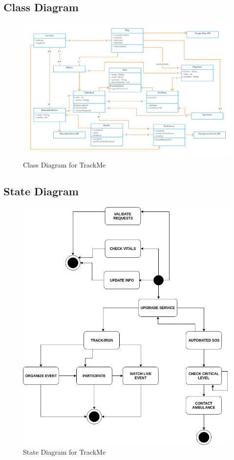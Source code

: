 \subsection{Class Diagram}
\begin{figure}[H]
	\begin{center}	
		\includegraphics[width=\textwidth]{./Diagrams/ClassDiagram.png}
      	\caption{Class Diagram for TrackMe}
        \label{TrackMe_classdiagram}
	\end{center}
\end{figure}

\subsection{State Diagram}
\begin{figure}[H]
	\begin{center}
		\includegraphics[width=\textwidth]{./Diagrams/StateDiagram.png}
      	\caption{State Diagram for TrackMe}
        \label{TrackMe_statediagram}
	\end{center}
\end{figure}